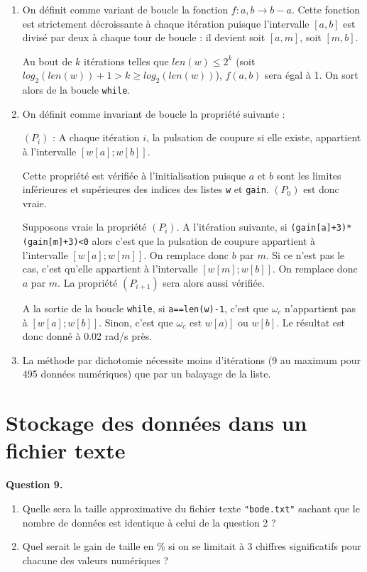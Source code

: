\documentclass[11pt,fleqn]{book} %
\begin{document}
\begin{enumerate}
\item On définit comme variant de boucle la fonction $f : a,b \to b-a$.
Cette fonction est strictement décroissante à chaque itération puisque l'intervalle $[a,b]$ est divisé par deux à chaque tour de boucle : il devient soit $[a,m]$, soit $[m,b]$.

Au bout de $k$ itérations telles que $len(w) \le 2^{k}$ (soit $log_2(len(w))+1 > k \ge log_2(len(w))$), $f(a,b)$ sera égal à 1. On sort alors de la boucle \texttt{while}.

\item On définit comme invariant de boucle la propriété suivante :

$(P_i)$ : A chaque itération $i$, la pulsation de coupure si elle existe, appartient à l'intervalle $[w[a];w[b]]$.

Cette propriété est vérifiée à l'initialisation puisque $a$ et $b$ sont les limites inférieures et supérieures des indices des listes \texttt{w} et \texttt{gain}. $(P_0)$ est donc vraie.

Supposons vraie la propriété $(P_i)$.
A l'itération suivante, si \texttt{(gain[a]+3)*(gain[m]+3)<0} alors c'est que la pulsation de coupure appartient à l'intervalle $[w[a];w[m]]$. On remplace donc $b$ par $m$.
Si ce n'est pas le cas, c'est qu'elle appartient à l'intervalle $[w[m];w[b]]$. On remplace donc $a$ par $m$. La propriété $(P_{i+1})$ sera alors aussi vérifiée.

A la sortie de la boucle \texttt{while}, si \texttt{a==len(w)-1}, c'est que $\omega_c$ n'appartient pas à $[w[a];w[b]]$. Sinon, c'est que $\omega_c$ est $w[a)]$ ou $w[b]$. Le résultat est donc donné à 0.02 rad/s près.
\item La méthode par dichotomie nécessite moins d'itérations (9 au maximum pour 495 données numériques) que par un balayage de la liste.

\end{enumerate}

\vfill

\pagebreak

\section{Stockage des données dans un fichier texte}

\begin{tBox}
\textbf{Question 9.}
\begin{enumerate}
\item Quelle sera la taille approximative du fichier texte \texttt{"bode.txt"} sachant que le nombre de données est identique à celui de la question 2 ?
\item Quel serait le gain de taille en \% si on se limitait à 3 chiffres significatifs pour chacune des valeurs numériques ?
\end{enumerate}
\end{tBox}
\end{document}
